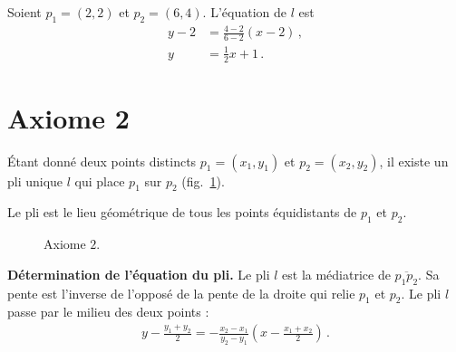 \begin{example}
Soient  $p_1=(2,2)$ et $p_2=(6,4)$. L'équation de $l$ est 
\begin{align*}
y-2&=\frac{4-2}{6-2}(x-2)\,,\\
y&=\frac{1}{2}x+1\,.
\end{align*}
\end{example}



\section{Axiome 2}\label{s.ax2}



\begin{axiom}
Étant donné deux points distincts $p_1=(x_1,y_1)$ et  $p_2=(x_2,y_2)$, il existe un pli unique $l$ qui place $p_1$ sur $p_2$ (fig.~\ref{f.origami-axiom2}).
\end{axiom}

Le pli est le lieu géométrique de tous les points équidistants de $p_1$ et $p_2$.\\

\begin{figure}[ht]
\centering
{}
\caption{Axiome  $2$.}\label{f.origami-axiom2}
\end{figure}

\noindent\textbf{Détermination de l'équation du pli.}
Le pli $l$ est la médiatrice de $\overline{p_1p_2}$. Sa pente est l'inverse de l'opposé de la pente de la droite qui relie $p_1$ et $p_2$. Le pli $l$ passe par le milieu des deux points :
\begin{align}
y - \frac{y_1+y_2}{2} = -\frac{x_2-x_1}{y_2-y_1}\left(x-\frac{x_1+x_2}{2}\right)\,.\label{eq.midpoint1}
\end{align}

